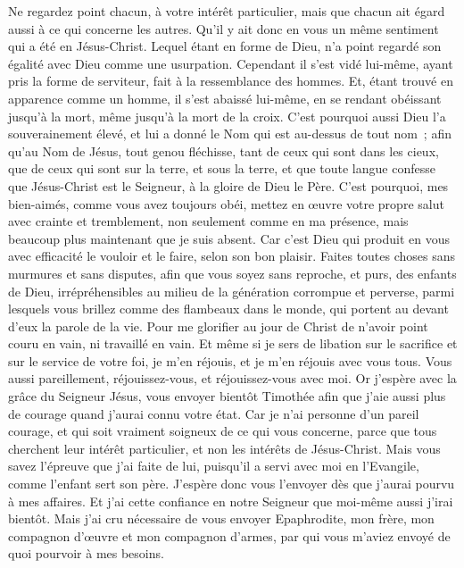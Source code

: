 \begin{multicols}{2}
Ne regardez point chacun, à votre intérêt particulier, mais que chacun ait égard aussi à ce qui concerne les autres.
Qu'il y ait donc en vous un même sentiment qui a été en Jésus-Christ. 
Lequel étant en forme de Dieu, n'a point regardé son égalité avec Dieu comme une usurpation.
Cependant il s'est vidé lui-même, ayant pris la forme de serviteur, fait à la ressemblance des hommes.
Et, étant trouvé en apparence comme un homme, il s'est abaissé lui-même, en se rendant obéissant jusqu'à la mort, même jusqu'à la mort de la croix. 
C'est pourquoi aussi Dieu l'a souverainement élevé, et lui a donné le Nom qui est au-dessus de tout nom~;
afin qu'au Nom de Jésus, tout genou fléchisse, tant de ceux qui sont dans les cieux, que de ceux qui sont sur la terre, et sous la terre,
et que toute langue confesse que Jésus-Christ est le Seigneur, à la gloire de Dieu le Père.
C'est pourquoi, mes bien-aimés, comme vous avez toujours obéi, mettez en œuvre votre propre salut avec crainte et tremblement, non seulement comme en ma présence, mais beaucoup plus maintenant que je suis absent.
Car c'est Dieu qui produit en vous avec efficacité le vouloir et le faire, selon son bon plaisir.
Faites toutes choses sans murmures et sans disputes,
afin que vous soyez sans reproche, et purs, des enfants de Dieu, irrépréhensibles au milieu de la génération corrompue et perverse, parmi lesquels vous brillez comme des flambeaux dans le monde, qui portent au devant d'eux la parole de la vie. 
Pour me glorifier au jour de Christ de n'avoir point couru en vain, ni travaillé en vain. 
Et même si je sers de libation sur le sacrifice et sur le service de votre foi, je m'en réjouis, et je m'en réjouis avec vous tous.
Vous aussi pareillement, réjouissez-vous, et réjouissez-vous avec moi.
Or j'espère avec la grâce du Seigneur Jésus, vous envoyer bientôt Timothée afin que j'aie aussi plus de courage quand j'aurai connu votre état. 
Car je n'ai personne d'un pareil courage, et qui soit vraiment soigneux de ce qui vous concerne,
parce que tous cherchent leur intérêt particulier, et non les intérêts de Jésus-Christ. 
Mais vous savez l'épreuve que j'ai faite de lui, puisqu'il a servi avec moi en l'Evangile, comme l'enfant sert son père.
J'espère donc vous l'envoyer dès que j'aurai pourvu à mes affaires.
Et j'ai cette confiance en notre Seigneur que moi-même aussi j'irai bientôt.
Mais j'ai cru nécessaire de vous envoyer Epaphrodite, mon frère, mon compagnon d'œuvre et mon compagnon d'armes, par qui vous m'aviez envoyé de quoi pourvoir à mes besoins.

\end{multicols}
